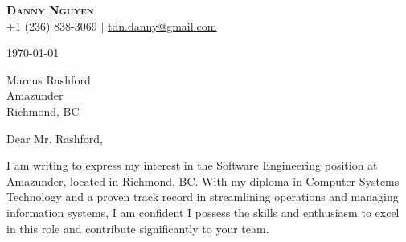 \documentclass[letterpaper,11pt]{article}
\begin{document}
\begin{center}
\textbf{\Huge \scshape Danny Nguyen} \\ \vspace{1pt}
\small +1 (236) 838-3069 $|$ \href{mailto:tdn.danny@gmail.com}{\underline{tdn.danny@gmail.com}}
\end{center}

\today
\vspace{20pt}

Marcus Rashford \\
Amazunder \\
Richmond, BC \\
\vspace{20pt}

Dear Mr. Rashford, \\
\vspace{10pt}

I am writing to express my interest in the Software Engineering position at Amazunder, located in Richmond, BC. With my diploma in Computer Systems Technology and a proven track record in streamlining operations and managing information systems, I am confident I possess the skills and enthusiasm to excel in this role and contribute significantly to your team.
\vspace{10pt}
\end{document}

